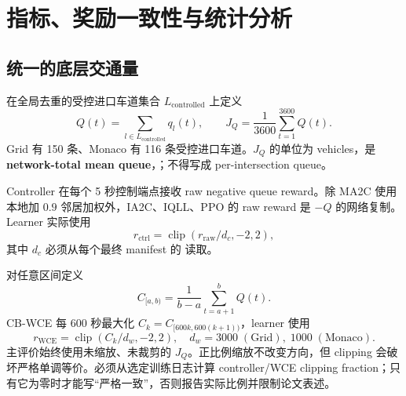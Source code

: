 \chapter{指标、奖励一致性与统计分析}

\section{统一的底层交通量}
在全局去重的受控进口车道集合 $L_{\mathrm{controlled}}$ 上定义
\[
Q(t)=\sum_{l\in L_{\mathrm{controlled}}}q_l(t),\qquad
J_Q=\frac{1}{3600}\sum_{t=1}^{3600}Q(t).
\]
Grid 有 150 条、Monaco 有 116 条受控进口车道。$J_Q$ 的单位为 vehicles，是 \textbf{network-total mean queue}，\lowerbetter；不得写成 per-intersection queue。

Controller 在每个 5 秒控制端点接收 raw negative queue reward。除 MA2C 使用本地加 $0.9$ 邻居加权外，IA2C、IQLL、PPO 的 raw reward 是 $-Q$ 的网络复制。Learner 实际使用
\[
r_{\mathrm{ctrl}}=\operatorname{clip}(r_{\mathrm{raw}}/d_c,-2,2),
\]
其中 $d_c$ 必须从每个最终 manifest 的  读取。

对任意区间定义
\[
C_{[a,b)}=\frac{1}{b-a}\sum_{t=a+1}^{b}Q(t).
\]
CB-WCE 每 600 秒最大化 $C_k=C_{[600k,600(k+1))}$，learner 使用
\[
r_{\mathrm{WCE}}=\operatorname{clip}(C_k/d_w,-2,2),
\quad d_w=3000\;(\mathrm{Grid}),\;1000\;(\mathrm{Monaco}).
\]
主评价始终使用未缩放、未裁剪的 $J_Q$。正比例缩放不改变方向，但 clipping 会破坏严格单调等价。必须从选定训练日志计算 controller/WCE clipping fraction；只有它为零时才能写“严格一致”，否则报告实际比例并限制论文表述。

